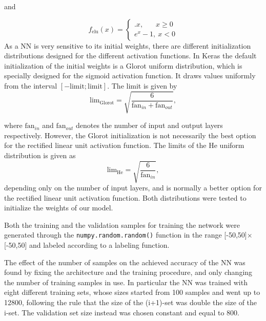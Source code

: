 \documentclass[prl,twocolumn]{revtex4-1}
\begin{document}
\begin{center}
and
\end{center}
\begin{equation}
    f_\textrm{elu}(x) = \begin{cases}.
    x, \ \ \ \ \ \ \ \, x \geq 0\\
    e^x -1, \ x < 0
    \end{cases}
    \label{eq:elu}
\end{equation}
As a NN is very sensitive to its initial weights, there are different initialization distributions designed for the different activation functions. In Keras the default initialization of the initial weights is a Glorot uniform distribution, which is specially designed for the sigmoid activation function. It draws values uniformly from the interval $[-\textrm{limit}; \textrm{limit}]$. The limit is given by 
\begin{equation}
    \textrm{lim}_\textrm{Glorot} = \sqrt{\frac{6}{\textrm{fan}_{in}+\textrm{fan}_{out}}},
\end{equation}

where $\textrm{fan}_{in}$ and $\textrm{fan}_{out}$ denotes the number of input and output layers respectively. However, the Glorot initialization is not necessarily the best option for the rectified linear unit activation function. The limits of the He uniform distribution is given as
\begin{equation}
    \textrm{lim}_\textrm{He} = \sqrt{\frac{6}{\textrm{fan}_{in}}},
\end{equation}
depending only on the number of input layers, and is normally a better option for the rectified linear unit activation function. Both distributions were tested to initialize the weights of our model.

Both the training and the validation samples for training the network were generated through the \texttt{numpy.random.random()} function in the range [-50,50]$\times$[-50,50] and labeled according to a labeling function.



\vskip 4pt
The effect of the number of samples on the achieved accuracy of the NN was found by fixing the architecture and the training procedure, and only changing the number of training samples in use. In particular the NN was trained with eight different training sets, whose sizes started from 100 samples and went up to 12800, following the rule that the size of the (i+1)-set was double the size of the i-set. The validation set size instead was chosen constant and equal to 800.
\end{document}
